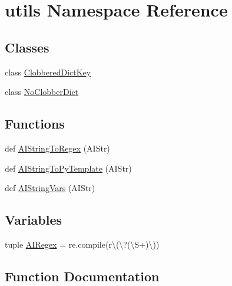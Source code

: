 \hypertarget{namespaceutils}{}\section{utils Namespace Reference}
\label{namespaceutils}
\subsection*{Classes}
\begin{DoxyCompactItemize}
\item 
class \hyperlink{classutils_1_1_clobbered_dict_key}{Clobbered\+Dict\+Key}
\item 
class \hyperlink{classutils_1_1_no_clobber_dict}{No\+Clobber\+Dict}
\end{DoxyCompactItemize}
\subsection*{Functions}
\begin{DoxyCompactItemize}
\item 
def \hyperlink{namespaceutils_a0151902f0ddac0b2729c4e2b301d9365}{A\+I\+String\+To\+Regex} (A\+I\+Str)
\item 
def \hyperlink{namespaceutils_a292f3fe97be34a22066ccab842cfd336}{A\+I\+String\+To\+Py\+Template} (A\+I\+Str)
\item 
def \hyperlink{namespaceutils_a811b4aaf68c89e05a5b3c98dc191d120}{A\+I\+String\+Vars} (A\+I\+Str)
\end{DoxyCompactItemize}
\subsection*{Variables}
\begin{DoxyCompactItemize}
\item 
tuple \hyperlink{namespaceutils_a5ec8e49012a754247760debfc4e2de3f}{A\+I\+Regex} = re.\+compile(r\textquotesingle{}\textbackslash{}(\textbackslash{}?(\textbackslash{}S+)\textbackslash{})\textquotesingle{})
\end{DoxyCompactItemize}


\subsection{Function Documentation}
\hypertarget{namespaceutils_a292f3fe97be34a22066ccab842cfd336}{}
